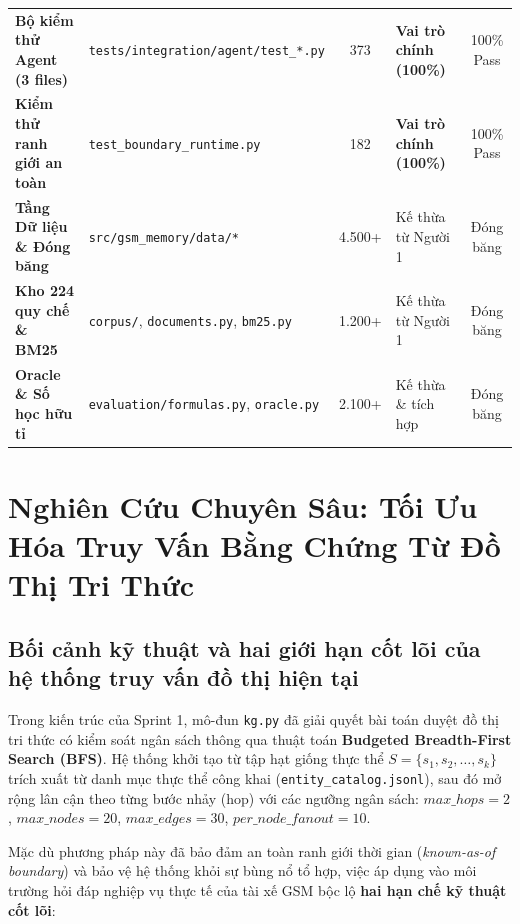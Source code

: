 \documentclass[a4paper,11pt]{article}
\begin{document}
\begin{table}[!htbp]
\begin{tabularx}{\textwidth}{l>{\raggedright\arraybackslash}Xc>{\raggedright\arraybackslash}p{2.8cm}c}
\textbf{Bộ kiểm thử Agent (3 files)} & \nolinkurl{tests/integration/agent/test_*.py} & 373 & \textbf{Vai trò chính (100\%)} & 100\% Pass \\
\textbf{Kiểm thử ranh giới an toàn} & \nolinkurl{test_boundary_runtime.py} & 182 & \textbf{Vai trò chính (100\%)} & 100\% Pass \\
\midrule
\textbf{Tầng Dữ liệu \& Đóng băng} & \nolinkurl{src/gsm_memory/data/*} & 4.500+ & Kế thừa từ Người 1 & Đóng băng \\
\textbf{Kho 224 quy chế \& BM25} & \nolinkurl{corpus/}, \nolinkurl{documents.py}, \nolinkurl{bm25.py} & 1.200+ & Kế thừa từ Người 1 & Đóng băng \\
\textbf{Oracle \& Số học hữu tỉ} & \nolinkurl{evaluation/formulas.py}, \nolinkurl{oracle.py} & 2.100+ & Kế thừa \& tích hợp & Đóng băng \\
\bottomrule
\end{tabularx}
\end{table}

\clearpage
\section{Nghiên Cứu Chuyên Sâu: Tối Ưu Hóa Truy Vấn Bằng Chứng Từ Đồ Thị Tri Thức}
\label{sec:graph-retrieval-opt}

\subsection{Bối cảnh kỹ thuật và hai giới hạn cốt lõi của hệ thống truy vấn đồ thị hiện tại}
\label{sec:kg-limitations}

Trong kiến trúc của Sprint 1, mô-đun \nolinkurl{kg.py} đã giải quyết bài toán duyệt đồ thị tri thức có kiểm soát ngân sách thông qua thuật toán \textbf{Budgeted Breadth-First Search (BFS)}. Hệ thống khởi tạo từ tập hạt giống thực thể $S = \{s_1, s_2, \dots, s_k\}$ trích xuất từ danh mục thực thể công khai (\nolinkurl{entity_catalog.jsonl}), sau đó mở rộng lân cận theo từng bước nhảy (hop) với các ngưỡng ngân sách: $max\_hops = 2$, $max\_nodes = 20$, $max\_edges = 30$, $per\_node\_fanout = 10$.

Mặc dù phương pháp này đã bảo đảm an toàn ranh giới thời gian (\textit{known-as-of boundary}) và bảo vệ hệ thống khỏi sự bùng nổ tổ hợp, việc áp dụng vào môi trường hỏi đáp nghiệp vụ thực tế của tài xế GSM bộc lộ \textbf{hai hạn chế kỹ thuật cốt lõi}:
\end{document}
